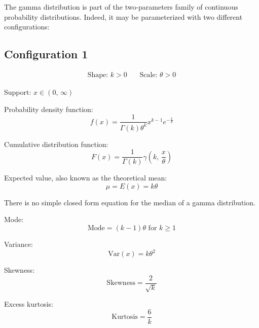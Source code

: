 \documentclass[12pt]{article}
\begin{document}
\singlespacing

\tableofcontents\pagebreak
\doublespacing
The gamma distribution is part of the two-parameters family of continuous probability distributions. Indeed, it may be
parameterized with two different configurations\cite{wikipediaGammaDistribution2022}:
\subsection{Configuration 1}
\begin{align*}
	\text{Shape: } k>0&&\, \text{Scale: }\theta>0
\end{align*}

Support: $x\in (0,\,\infty)$

Probability density function:
\begin{equation}\label{eq:gamma-pdf-1}
	f(x) = \frac{1}{\Gamma(k)\theta^k}x^{k-1}e^{-\frac{x}{\theta}}
\end{equation}

Cumulative distribution function:
\begin{equation}\label{eq:gamma-cdf-1}
	F(x) = \frac{1}{\Gamma(k)}\gamma \left(k,\,\frac{x}{\theta}\right)
\end{equation}

Expected value, also known as the theoretical mean:
\begin{equation}\label{eq:gamma-expected-value-1}
	\mu = E(x) = k\theta
\end{equation}

There is no simple closed form equation for the median of a gamma distribution.

Mode:
\begin{equation}\label{eq:gamma-mode-1}
	\text{Mode} = (k-1)\theta\text{ for }k \geq 1
\end{equation}

Variance:
\begin{equation}\label{eq:gamma-variance-1}
	\text{Var}(x) = k\theta^2
\end{equation}

Skewness:
\begin{equation}\label{eq:gamma-skewness-1}
	\text{Skewness} = \frac{2}{\sqrt{k}}
\end{equation}

Excess kurtosis:
\begin{equation}\label{eq:gamma-kurtosis-1}
	\text{Kurtosis} = \frac{6}{k}
\end{equation}
\end{document}
